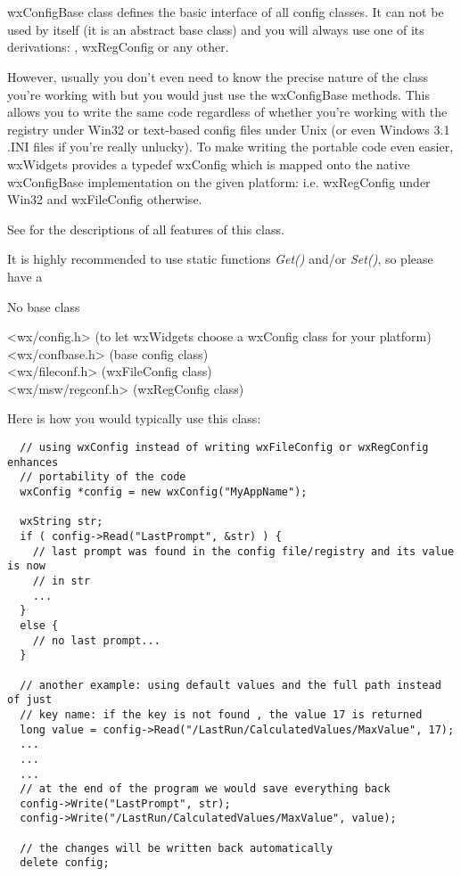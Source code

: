 \section{}\label{wxconfigbase}

wxConfigBase class defines the basic interface of all config classes. It can
not be used by itself (it is an abstract base class) and you will always use one
of its derivations: ,
wxRegConfig or any other.

However, usually you don't even need to know the precise nature of the class
you're working with but you would just use the wxConfigBase methods. This
allows you to write the same code regardless of whether you're working with
the registry under Win32 or text-based config files under Unix (or even
Windows 3.1 .INI files if you're really unlucky). To make writing the portable
code even easier, wxWidgets provides a typedef wxConfig
which is mapped onto the native wxConfigBase implementation on the given
platform: i.e. wxRegConfig under Win32 and
wxFileConfig otherwise.

See  for the descriptions of all
features of this class.

It is highly recommended to use static functions {\it Get()} and/or {\it Set()}, 
so please have a 


No base class


<wx/config.h> (to let wxWidgets choose a wxConfig class for your platform)\\
<wx/confbase.h> (base config class)\\
<wx/fileconf.h> (wxFileConfig class)\\
<wx/msw/regconf.h> (wxRegConfig class)


Here is how you would typically use this class:

\begin{verbatim}
  // using wxConfig instead of writing wxFileConfig or wxRegConfig enhances
  // portability of the code
  wxConfig *config = new wxConfig("MyAppName");

  wxString str;
  if ( config->Read("LastPrompt", &str) ) {
    // last prompt was found in the config file/registry and its value is now
    // in str
    ...
  }
  else {
    // no last prompt...
  }

  // another example: using default values and the full path instead of just
  // key name: if the key is not found , the value 17 is returned
  long value = config->Read("/LastRun/CalculatedValues/MaxValue", 17);
  ...
  ...
  ...
  // at the end of the program we would save everything back
  config->Write("LastPrompt", str);
  config->Write("/LastRun/CalculatedValues/MaxValue", value);

  // the changes will be written back automatically
  delete config;
\end{verbatim}


